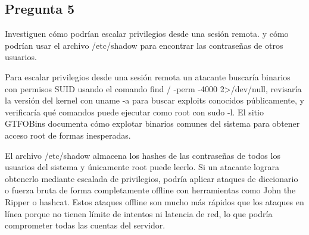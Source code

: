 \subsection{Pregunta 5}

Investiguen cómo podrían escalar privilegios desde una sesión remota. y cómo podrían usar el archivo /etc/shadow para encontrar las contraseñas de otros usuarios.

\begin{respuesta}
Para escalar privilegios desde una sesión remota un atacante buscaría binarios con permisos SUID usando el comando find / -perm -4000 2>/dev/null, revisaría la versión del kernel con uname -a para buscar exploits conocidos públicamente, y verificaría qué comandos puede ejecutar como root con sudo -l. El sitio GTFOBins documenta cómo explotar binarios comunes del sistema para obtener acceso root de formas inesperadas.

El archivo /etc/shadow almacena los hashes de las contraseñas de todos los usuarios del sistema y únicamente root puede leerlo. Si un atacante lograra obtenerlo mediante escalada de privilegios, podría aplicar ataques de diccionario o fuerza bruta de forma completamente offline con herramientas como John the Ripper o hashcat. Estos ataques offline son mucho más rápidos que los ataques en línea porque no tienen límite de intentos ni latencia de red, lo que podría comprometer todas las cuentas del servidor.

    
\end{respuesta}
